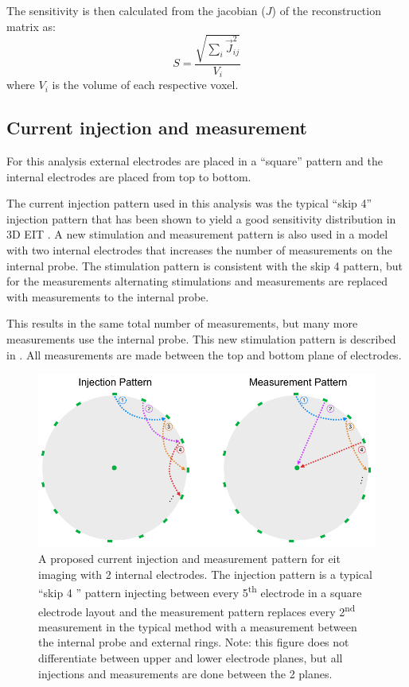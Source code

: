 The sensitivity is then calculated from the jacobian ($J$) of the reconstruction matrix as:
\begin{equation}
	S = \frac{\sqrt{\sum_{i}\vec{J}_{ij}^2}}{V_i}
\end{equation}
where $V_i$ is the volume of each respective voxel. 

\subsection{Current injection and measurement}
For this analysis external electrodes are placed in 
a ``square'' pattern \parencite{grychtol_3d_2016} 
and the internal electrodes are placed from top to 
bottom. 

The current injection pattern used in this analysis was the 
typical ``skip 4'' injection pattern that has been shown to yield 
a good sensitivity distribution in 3D EIT \parencite{grychtol_3d_2016}.
A new stimulation and measurement pattern is also used in a model with 
two internal electrodes that increases
the number of measurements on the internal probe. The stimulation 
pattern is consistent with the skip 4 pattern, but 
for the measurements alternating stimulations and measurements
are replaced with measurements to the internal probe. 

This results in the same total number of measurements, but many more measurements
use the internal probe. This new stimulation pattern is described in . 
All measurements are made between the top and bottom plane of electrodes.

\begin{figure}
\centering
\includegraphics[width=\textwidth]{chapter6-internal_electrodes/imgs/current_injection.pdf}
\caption[Current injection patterns with internal electrodes]{A proposed current injection and measurement pattern for \acrshort{eit} imaging with 2 internal electrodes.
The injection pattern is a typical ``skip 4 '' pattern injecting between every 5\textsuperscript{th} electrode in a square electrode layout and the
measurement pattern replaces every 2\textsuperscript{nd} measurement in the typical method with a measurement between the internal probe and
external rings. Note: this figure does not differentiate between upper and lower electrode planes, but all injections and measurements are done between 
the 2 planes.}
\label{fig:modified_measurement}
\end{figure}

